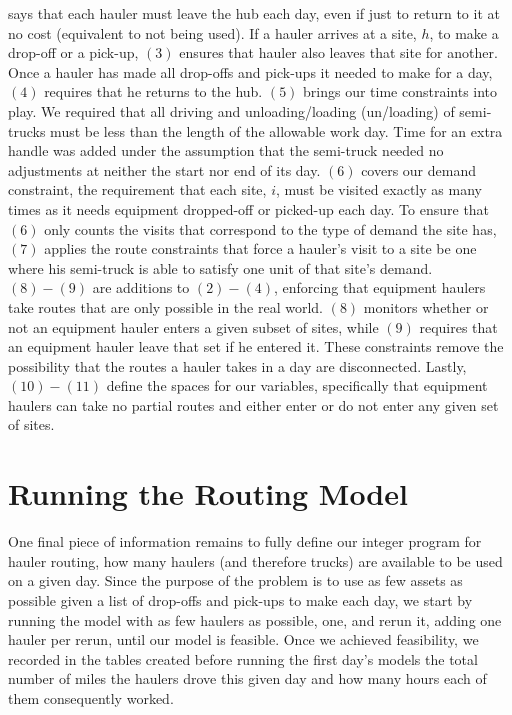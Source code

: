 \documentclass[letterpaper,10pt,english]{sphinxmanual}
\begin{document}
says that each hauler must leave the hub each day, even if just to return to it
at no cost (equivalent to not being used). If a hauler arrives at a site,
\(h\), to make a drop-off or a pick-up, \((3)\) ensures that hauler
also leaves that site for another. Once a hauler has made all drop-offs and
pick-ups it needed to make for a day, \((4)\) requires that he returns to
the hub. \((5)\) brings our time constraints into play. We required that
all driving and unloading/loading (un/loading) of semi-trucks must be less
than the length of the allowable work day. Time for an extra handle was added
under the assumption that the semi-truck needed no adjustments at neither the
start nor end of its day. \((6)\) covers our demand
constraint, the requirement that each site, \(i\), must be visited exactly
as many times as it needs equipment dropped-off or picked-up each
day. To ensure that \((6)\) only counts the visits that correspond to the
type of demand the site has, \((7)\) applies the route constraints that
force a hauler's visit to a site be one where his semi-truck is able to
satisfy one unit of that site's demand. \((8)-(9)\) are additions to
\((2)-(4)\), enforcing that equipment haulers take routes that are only
possible in the real world. \((8)\) monitors whether or not an equipment
hauler enters a given subset of sites, while \((9)\) requires that an
equipment hauler leave that set if he entered it. These constraints remove
the possibility that the routes a hauler takes in a day are disconnected.
Lastly, \((10)-(11)\) define the spaces for our variables, specifically
that equipment haulers can take no partial routes and either enter or do not
enter any given set of sites.


\section{Running the Routing Model}
\label{\detokenize{daily-routing:running-the-routing-model}}
One final piece of information remains to fully define our integer program
for hauler routing, how many haulers (and therefore trucks) are available
to be used on a given day. Since the purpose of the problem is to use as few
assets as possible given a list of drop-offs and pick-ups to make each day,
we start by running the model with as few haulers as possible, one, and rerun
it, adding one hauler per rerun, until our model is feasible. Once we achieved
feasibility, we recorded in the tables created before running the first day's
models the total number of miles the haulers drove this given day and how
many hours each of them consequently worked.
\end{document}
